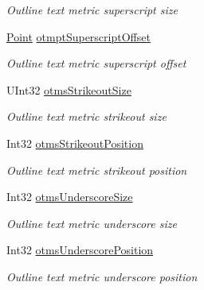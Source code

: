 \begin{DoxyCompactItemize}
\begin{DoxyCompactList}\small\item\em Outline text metric superscript size \end{DoxyCompactList}\item 
\hyperlink{namespace_pdf_file_writer_adf167276d483eb5d597fed4e3297ba17a2a3cd5946cfd317eb99c3d32e35e2d4c}{Point} \hyperlink{class_pdf_file_writer_1_1_win_outline_text_metric_ae93376f7fbd0f15ca5109a587eb6a28a}{otmpt\+Superscript\+Offset}
\begin{DoxyCompactList}\small\item\em Outline text metric superscript offset \end{DoxyCompactList}\item 
U\+Int32 \hyperlink{class_pdf_file_writer_1_1_win_outline_text_metric_aee76acbc25d7505475050c5ed9d04198}{otms\+Strikeout\+Size}
\begin{DoxyCompactList}\small\item\em Outline text metric strikeout size \end{DoxyCompactList}\item 
Int32 \hyperlink{class_pdf_file_writer_1_1_win_outline_text_metric_a1069e7439f1f7748b149a1d934ea77d9}{otms\+Strikeout\+Position}
\begin{DoxyCompactList}\small\item\em Outline text metric strikeout position \end{DoxyCompactList}\item 
Int32 \hyperlink{class_pdf_file_writer_1_1_win_outline_text_metric_af378c26932c9c613054f916cd8c910a2}{otms\+Underscore\+Size}
\begin{DoxyCompactList}\small\item\em Outline text metric underscore size \end{DoxyCompactList}\item 
Int32 \hyperlink{class_pdf_file_writer_1_1_win_outline_text_metric_a99f19d8d5b9816abccdc7eb7bbe82639}{otms\+Underscore\+Position}
\begin{DoxyCompactList}\small\item\em Outline text metric underscore position \end{DoxyCompactList}\item 

\end{DoxyCompactItemize}
